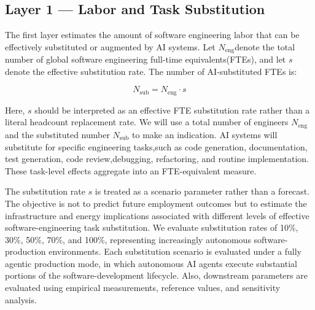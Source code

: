 \documentclass{article}
\begin{document}
\subsection{Layer 1 --- Labor and Task Substitution}
\label{layer1}

The first layer estimates the amount of software engineering labor that can be effectively substituted or augmented by AI systems. Let $N_{\mathrm{eng}}$denote the total number of global software engineering full-time equivalents(FTEs), and let $s$ denote the effective substitution rate. The number of AI-substituted FTEs is:

\begin{equation}
N_{\mathrm{sub}} = N_{\mathrm{eng}} \cdot s
\label{eq1}
\end{equation}

Here, $s$ should be interpreted as an effective FTE substitution rate rather than a literal headcount replacement rate. We will use a total number of engineers $N_{\mathrm{eng}}$ and the substituted number $N_{\mathrm{sub}}$ to make an indication. AI systems will substitute for specific engineering tasks,such as code generation, documentation, test generation, code review,debugging, refactoring, and routine implementation. These task-level effects aggregate into an FTE-equivalent measure.

The substitution rate $s$ is treated as a scenario parameter rather than a forecast. The objective is not to predict future employment outcomes but to estimate the infrastructure and energy implications associated with different levels of effective software-engineering task substitution. We evaluate substitution rates of 10\%, 30\%, 50\%, 70\%, and 100\%, representing increasingly autonomous software-production environments. Each substitution scenario is evaluated under a fully agentic production mode, in which autonomous AI agents execute substantial portions of the software-development lifecycle. Also, downstream parameters are evaluated using empirical measurements, reference values, and sensitivity analysis.
\end{document}
